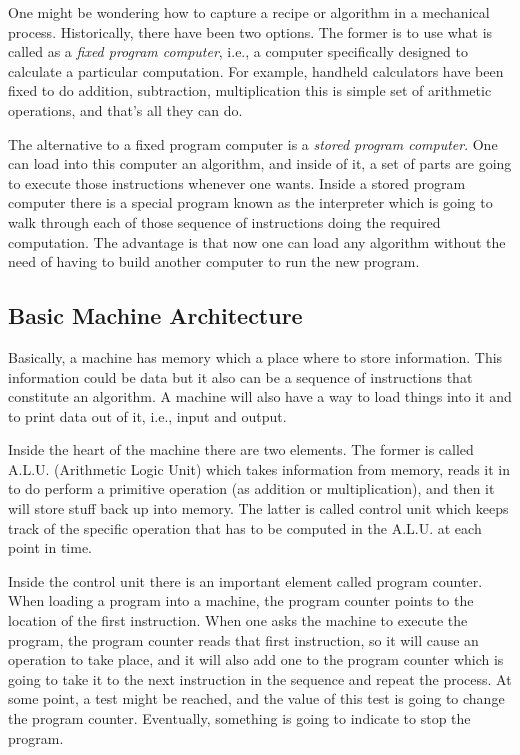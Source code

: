 \documentclass[a4paper]{article}
\begin{document}
One might be wondering how to capture a recipe or algorithm in a mechanical
process. Historically, there have been two options. The former is to use what
is called as a \textit{fixed program computer}, i.e., a computer specifically
designed to calculate a particular computation. For example, handheld
calculators have been fixed to do addition, subtraction, multiplication this
is simple set of arithmetic operations, and that's all they can do.

The alternative to a fixed program computer is a \textit{stored program
computer}. One can load into this computer an algorithm, and inside of it, a
set of parts are going to execute those instructions whenever one wants.
Inside a stored program computer there is a special program known as the
interpreter which is going to walk through each of those sequence of
instructions doing the required computation. The advantage is that now one can
load any algorithm without the need of having to build another computer to run
the new program.

\subsection{Basic Machine Architecture}

Basically, a machine has memory which a place where to store information.
This information could be data but it also can be a sequence of instructions
that constitute an algorithm. A machine will also have a way to load things
into it and to print data out of it, i.e., input and output.

Inside the heart of the machine there are two elements. The former is called
A.L.U. (Arithmetic Logic Unit) which takes information from memory, reads it
in to do perform a primitive operation (as addition or multiplication), and
then it will store stuff back up into memory. The latter is called control
unit which keeps track of the specific operation that has to be
computed in the A.L.U. at each point in time.

Inside the control unit there is an important element called program counter.
When loading a program into a machine, the program counter points to the
location of the first instruction. When one asks the machine to execute the
program, the program counter reads that first instruction, so it will cause an
operation to take place, and it will also add one to the program counter which
is going to take it to the next instruction in the sequence and repeat the
process. At some point, a test might be reached, and the value of this test is
going to change the program counter. Eventually, something is going to indicate
to stop the program.
\end{document}
